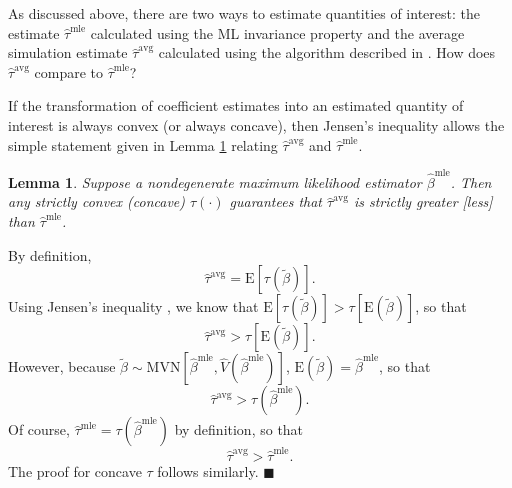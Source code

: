 \documentclass[11pt]{article}
\newtheorem{lemma}{Lemma}
\newenvironment{proof}[1][Proof]{\begin{trivlist}
\item[\hskip \labelsep {\bfseries #1}]}{\end{trivlist}}
\begin{document}
As discussed above, there are two ways to estimate quantities of interest: the estimate $\hat{\tau}^\text{mle}$ calculated using the ML invariance property and the average simulation estimate $\hat{\tau}^\text{avg}$ calculated using the algorithm described in \cite{KingTomzWittenberg2000}. How does $\hat{\tau}^\text{avg}$ compare to $\hat{\tau}^{\text{mle}}$? %



If the transformation of coefficient estimates into an estimated quantity of interest is always convex (or always concave), then Jensen's inequality allows the simple statement given in Lemma \ref{lem:direction} relating $\hat{\tau}^\text{avg}$ and $\hat{\tau}^{\text{mle}}$.

\begin{lemma}\label{lem:direction}
Suppose a nondegenerate maximum likelihood estimator $\hat{\beta}^\text{mle}$.
Then any strictly convex (concave) $\tau(\cdot)$ guarantees that $\hat{\tau}^{\text{avg}}$ is strictly greater [less] than $\hat{\tau}^\text{mle}$.
\end{lemma}
\begin{proof}
By definition, $$ \hat{\tau}^{\text{avg}} = \text{E}\left[ \tau \left(\tilde{\beta} \right) \right].$$
Using Jensen's inequality \citep[p.\@ 190, Thm.\@ 4.7.7]{CasellaBerger2002}, we know that $\text{E}\left[ \tau \left(\tilde{\beta} \right) \right] > \tau \left[ \text{E}\left( \tilde{\beta} \right) \right]$, so that $$\hat{\tau}^{\text{avg}} > \tau \left[ \text{E}\left( \tilde{\beta} \right) \right].$$
However, because $\tilde{\beta} \sim \text{MVN} \left[ \hat{\beta}^{\text{mle}}, \hat{V} \left( \hat{\beta}^{\text{mle}} \right) \right]$, $\text{E}\left( \tilde{\beta} \right) = \hat{\beta}^\text{mle}$, so that
$$\hat{\tau}^{\text{avg}} > \tau \left( \hat{\beta}^\text{mle}\right).$$
Of course, $\hat{\tau}^\text{mle} = \tau \left( {\hat{\beta}^\text{mle}} \right)$ by definition, so that $$\hat{\tau}^{\text{avg}} > \hat{\tau}^\text{mle}.$$
The proof for concave $\tau$ follows similarly.
 $\blacksquare$
\end{proof}
\end{document}
